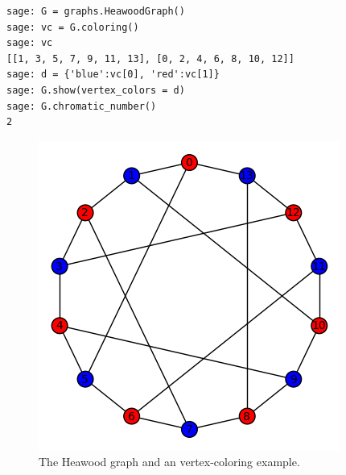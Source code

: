 \begin{example}
\begin{lstlisting}
sage: G = graphs.HeawoodGraph()
sage: vc = G.coloring()
sage: vc
[[1, 3, 5, 7, 9, 11, 13], [0, 2, 4, 6, 8, 10, 12]]
sage: d = {'blue':vc[0], 'red':vc[1]}
sage: G.show(vertex_colors = d)
sage: G.chromatic_number()
2
\end{lstlisting}


\begin{figure}[!htbp]
\centering
{}
\includegraphics[scale=0.7]{image/graph-coloring/heawood-graph-vertex-coloring-example}
\caption{The Heawood graph and an vertex-coloring example.}
\label{fig:graph-coloring:heawood-graph-vertex-coloring-example}
\end{figure}


\end{example}


